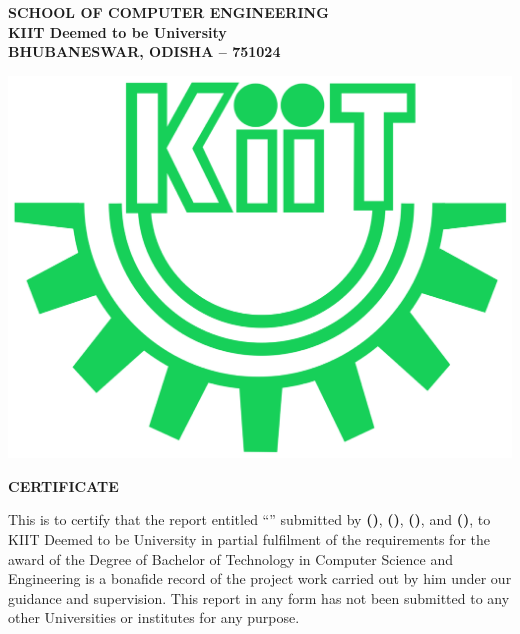 \begin{titlepage}
\vfill
\begin{center}
    \textbf{
    SCHOOL OF COMPUTER ENGINEERING\\ 
    KIIT Deemed to be University\\ 
    BHUBANESWAR, ODISHA – 751024
    }
    
    \vspace{1cm}
    
    \includegraphics[scale=0.2]{covers/images/logo_gecp.png}
    
    \vspace{1cm}
    
    \textbf{
        \Large{
            CERTIFICATE
        }
    }
    
\end{center}

\noindent This is to certify that the report entitled “\textbf{\cTitle}” submitted by \textbf{\MakeUppercase{\cMembOne} (\cMembOneRegNo)}, \textbf{\MakeUppercase{\cMembTwo} (\cMembTwoRegNo)}, \textbf{\MakeUppercase{\cMembThree} (\cMembThreeRegNo)}, and \textbf{\MakeUppercase{\cMembFour} (\cMembFourRegNo)},
to KIIT Deemed to be University in partial fulfilment of the requirements for the award of the Degree of Bachelor of Technology in Computer Science and Engineering is a bonafide record of the project work carried out by him under our guidance and supervision. This report in any form has not been submitted to any other Universities or institutes for any purpose.

\vspace{2cm}



\end{titlepage}
